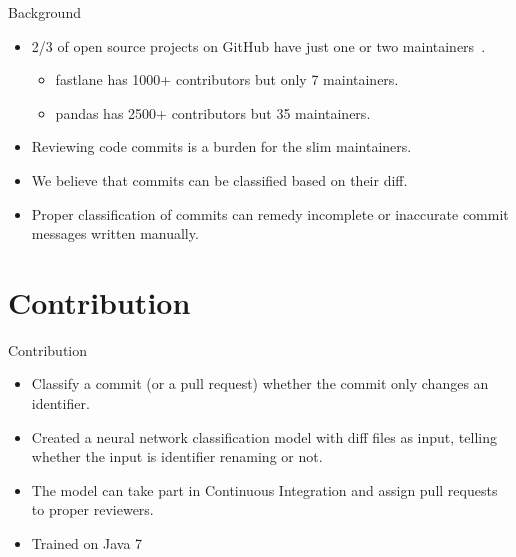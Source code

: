 \documentclass[xcolor=svgnames]{beamer}
\begin{document}
\begin{frame}[t]{Background}
\begin{itemize}
\item 2/3 of open source projects on GitHub have just one or two maintainers~\cite{avelino_what_2015}.
	\begin{itemize}
		\item<only@2-> fastlane has 1000+ contributors but only 7 maintainers.
		\item<only@3-> pandas has 2500+ contributors but 35 maintainers.
	\end{itemize}
\item<only@4-> Reviewing code commits is a burden for the slim maintainers.
\item<only@5-> We believe that commits can be classified based on their diff.
\item<only@5-> Proper classification of commits can remedy incomplete or inaccurate commit messages written manually.
\end{itemize}

\end{frame}


\section{Contribution}

\begin{frame}{Contribution}
\begin{itemize}
	\item Classify a commit (or a pull request) whether the commit only changes an identifier.
	\item Created a neural network classification model with diff files as input, telling whether the input is identifier renaming or not.
	\item The model can take part in Continuous Integration and assign pull requests to proper reviewers.
	\item Trained on Java 7
\end{itemize}
\end{frame}
\end{document}
